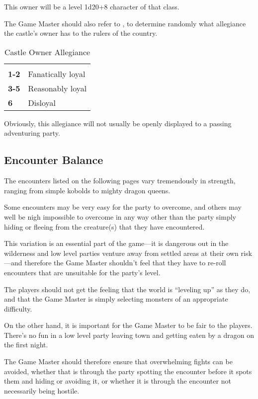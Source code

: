 \begin{multicols*}{2}
This owner will be a level 1d20+8 character of that class.

The Game Master should also refer to , to determine randomly what allegiance the castle’s owner has to the rulers of the country.

\begin {table}[H]
  \caption{Castle Owner Allegiance}\label{tab:Castle Owner Allegiance}
  \begin{tabularx}{\columnwidth}{>{\bfseries}YY}
	 & \\
	1-2 & Fanatically loyal\\
	3-5 & Reasonably loyal\\
	6 & Disloyal
  \end {tabularx}
\end {table}

Obviously, this allegiance will not usually be openly displayed to a passing adventuring party.

\subsection{Encounter Balance}
The encounters listed on the following pages vary tremendously in strength, ranging from simple kobolds to mighty dragon queens.

Some encounters may be very easy for the party to overcome, and others may well be nigh impossible to overcome in any way other than the party simply hiding or fleeing from the creature(s) that they have encountered.

This variation is an essential part of the game—it is dangerous out in the wilderness and low level parties venture away from settled areas at their own risk—and therefore the Game Master shouldn’t feel that they have to re-roll encounters that are unsuitable for the party’s level.

The players should not get the feeling that the world is “leveling up” as they do, and that the Game Master is simply selecting monsters of an appropriate difficulty.

On the other hand, it is important for the Game Master to be fair to the players. There’s no fun in a low level party leaving town and getting eaten by a dragon on the first night.

The Game Master should therefore ensure that overwhelming fights can be avoided, whether that is through the party spotting the encounter before it spots them and hiding or avoiding it, or whether it is through the encounter not necessarily being hostile.


\end{multicols*}
